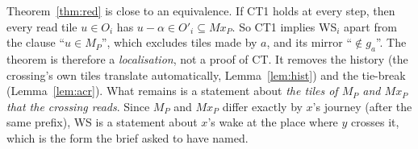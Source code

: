 \begin{remark}\label{rem:honest}
Theorem~\ref{thm:red} is close to an equivalence. If CT1 holds at every step, then every read tile $u\in O_i$ has $u-\alpha\in O'_i\subseteq Mx_P$. So CT1 implies WS$_i$ apart from the clause ``$u\in M_P$'', which excludes tiles made by $a$, and its mirror ``$\notin g_a$''.
The theorem is therefore a \emph{localisation}, not a proof of CT. It removes the history (the crossing's own tiles translate automatically, Lemma~\ref{lem:hist}) and the tie-break (Lemma~\ref{lem:acr}).
What remains is a statement about \emph{the tiles of $M_P$ and $Mx_P$ that the crossing reads}. Since $M_P$ and $Mx_P$ differ exactly by $x$'s journey (after the same prefix), WS is a statement about $x$'s wake at the place where $y$ crosses it, which is the form the brief asked to have named.
\end{remark}


